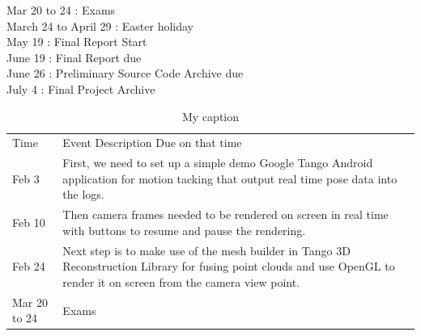 \documentclass[12pt,twoside]{article}
\begin{document}
Mar 20 to 24 : Exams\\
March 24 to April 29 : Easter holiday\\
May 19 : Final Report Start\\
June 19 : Final Report due \\
June 26 : Preliminary Source Code Archive due\\
July 4 : Final Project Archive\\
\begin{table}[]
\centering
\caption{My caption}
\label{my-label}
\begin{tabular}{ll}
Time                        & Event Description Due on that time                                                                                                                                                                                                                                                                                                                                   \\
Feb 3                       & First, we need to set up a simple demo Google Tango Android application for motion tacking that output real time pose data into the logs.                                                                                                                                                                                                                            \\
Feb 10                      & Then camera frames needed to be rendered on screen in real time with buttons to resume and pause the rendering.                                                                                                                                                                                                                                                      \\
Feb 24                      & Next step is to make use of the mesh builder in Tango 3D Reconstruction Library for fusing point clouds and use OpenGL to render it on screen from the camera view point.                                                                                                                                                                                            \\
Mar 20 to 24                & Exams                                                                                                                                                                                                                                                                                                                                                                \\

\end{tabular}
\end{table}
\end{document}
